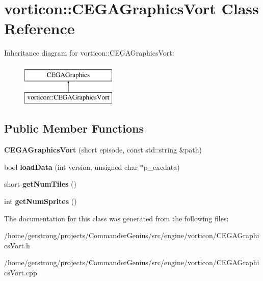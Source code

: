 \hypertarget{classvorticon_1_1_c_e_g_a_graphics_vort}{
\section{vorticon::CEGAGraphicsVort Class Reference}
\label{classvorticon_1_1_c_e_g_a_graphics_vort}
}
Inheritance diagram for vorticon::CEGAGraphicsVort:\begin{figure}[H]
\begin{center}
\leavevmode
\includegraphics[height=2cm]{classvorticon_1_1_c_e_g_a_graphics_vort}
\end{center}
\end{figure}
\subsection*{Public Member Functions}
\begin{DoxyCompactItemize}
\item 
\hypertarget{classvorticon_1_1_c_e_g_a_graphics_vort_a4914ca969695da97fe230ae8643fabd1}{
{\bfseries CEGAGraphicsVort} (short episode, const std::string \&path)}
\label{classvorticon_1_1_c_e_g_a_graphics_vort_a4914ca969695da97fe230ae8643fabd1}

\item 
\hypertarget{classvorticon_1_1_c_e_g_a_graphics_vort_af410429fca1c9ba05391c9cf95fc1d02}{
bool {\bfseries loadData} (int version, unsigned char $\ast$p\_\-exedata)}
\label{classvorticon_1_1_c_e_g_a_graphics_vort_af410429fca1c9ba05391c9cf95fc1d02}

\item 
\hypertarget{classvorticon_1_1_c_e_g_a_graphics_vort_a7c9c1daba8144cfb9547482a65a18975}{
short {\bfseries getNumTiles} ()}
\label{classvorticon_1_1_c_e_g_a_graphics_vort_a7c9c1daba8144cfb9547482a65a18975}

\item 
\hypertarget{classvorticon_1_1_c_e_g_a_graphics_vort_a7ed8b3aa6f8855db5eaaecf79e63e4a2}{
int {\bfseries getNumSprites} ()}
\label{classvorticon_1_1_c_e_g_a_graphics_vort_a7ed8b3aa6f8855db5eaaecf79e63e4a2}

\end{DoxyCompactItemize}


The documentation for this class was generated from the following files:\begin{DoxyCompactItemize}
\item 
/home/gerstrong/projects/CommanderGenius/src/engine/vorticon/CEGAGraphicsVort.h\item 
/home/gerstrong/projects/CommanderGenius/src/engine/vorticon/CEGAGraphicsVort.cpp\end{DoxyCompactItemize}
